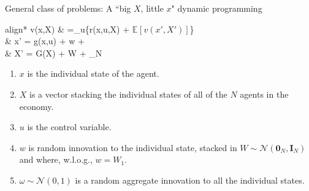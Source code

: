\documentclass[aspectratio=169,10pt]{beamer}
\newcommand{\expec}[2][]{\ensuremath{\mathbb{E}_{{#1}}\left[ {#2} \right]}}
\begin{document}
\begin{frame}{General class of problems: A ``big $X$, little $x$" dynamic programming}
	\begin{empheq}[box=\tcbhighmath]{align*}
		v(x,X)       & =\max_{u}\left\{r\big(x,u,X\big) + \beta \expec{v(x',X')}\right\} \\
		 & x' = g(x,u) + \sigma w + \eta \omega                              \\
					& X' = G(X) + \Omega W + \eta \omega {}_N
	\end{empheq}
	\begin{enumerate}
		\item $x$ is the individual state of the agent.
		\vspace{0.1in}
		\item $X$ is a vector stacking the individual states of all of the $N$ agents in the economy.
		\vspace{0.1in}
		\item $u$ is the control variable.
		\vspace{0.1in}
		\item $w$ is random innovation to the individual state, stacked in $W \sim \mathcal{N}(\mathbf{0}_N,\mathbf{I}_N)$ and where, w.l.o.g., $w = W_1$.
		\vspace{0.1in}
		\item $\omega \sim \mathcal{N}(0,1)$ is a random aggregate innovation to all the individual states.
		
	\end{enumerate}
	
\end{frame}
\end{document}
